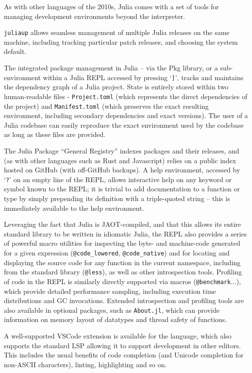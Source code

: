 \documentclass{webofc}
\begin{document}
As with other languages of the 2010s, Julia comes with a set of tools for
managing development environments beyond the interpreter.

\texttt{juliaup} allows seamless management of multiple Julia releases on the same
machine, including tracking particular patch releases, and choosing the system
default.

The integrated package management in Julia -- via the Pkg library, or a
sub-environment within a Julia REPL accessed by pressing `\texttt{]}', tracks and
maintains the dependency graph of a Julia project. State is entirely stored
within two human-readable files - \texttt{Project.toml} (which represents the direct
dependencies of the project) and \texttt{Manifest.toml} (which preserves the exact
resulting environment, including secondary dependencies and exact versions).
The user of a Julia codebase can easily reproduce the exact environment used by
the codebase as long as these files are provided.

The Julia Package ``General Registry'' indexes packages and their releases, and
(as with other languages such as Rust and Javascript) relies on a public index
hosted on GitHub (with off-GitHub backups). A help environment, accessed by
`\texttt{?}' on an empty line of the REPL, allows interactive help on any keyword
or symbol known to the REPL; it is trivial to add documentation to a function or
type by simply prepending its definition with a triple-quoted string -- this is
immediately available to the help environment.

Leveraging the fact that Julia is JAOT-compiled, and that this allows its entire
standard library to be written in idiomatic Julia, the REPL also provides a
series of powerful macro utilities for inspecting the byte- and machine-code
generated for a given expression (\verb$@code_lowered$, \verb$@code_native$) and
for locating and displaying the source code for any function in the current
namespace, including from the standard library (\verb$@less$), as well as other
introspection tools. Profiling of code in the REPL is similarly directly
supported via macros (\verb$@benchmark$...), which provide detailed performance
sampling, including execution time distributions and GC invocations. Extended
introspection and profiling tools are also available in optional packages, such
as \texttt{About.jl}, which can provide information on memory layout of
datatypes and thread safety of functions.

A well-supported VSCode extension is available for the language, which also
supports the standard LSP allowing it to support development in other editors.
This includes the usual benefits of code completion (and Unicode completion for
non-ASCII characters), linting, highlighting and so on.
\end{document}
